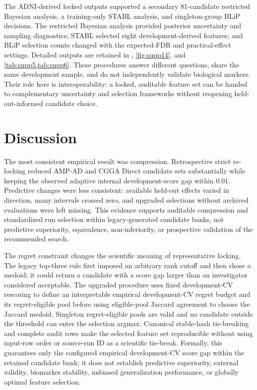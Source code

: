 The ADNI-derived locked outputs supported a secondary 81-candidate restricted Bayesian analysis, a training-only STABL analysis, and singleton-group BLiP decisions. The restricted Bayesian analysis provided posterior uncertainty and sampling diagnostics; STABL selected eight development-derived features; and BLiP selection counts changed with the expected-FDR and practical-effect settings. Detailed outputs are retained in , \cref{fig:supp14}, and \cref{tab:supp5,tab:supp6}. These procedures answer different questions, share the same development sample, and do not independently validate biological markers. Their role here is interoperability: a locked, auditable feature set can be handed to complementary uncertainty and selection frameworks without reopening held-out-informed candidate choice.

\FloatBarrier
\section{Discussion}

The most consistent empirical result was compression. Retrospective strict re-locking reduced AMP-AD and CGGA Direct candidate sets substantially while keeping the observed adaptive internal development-score gap within 0.01. Predictive changes were less consistent: available held-out effects varied in direction, many intervals crossed zero, and upgraded selections without archived evaluations were left missing. This evidence supports auditable compression and standardized run selection within legacy-generated candidate banks, not predictive superiority, equivalence, non-inferiority, or prospective validation of the recommended search.

The regret constraint changes the scientific meaning of representative locking. The legacy top-three rule first imposed an arbitrary rank cutoff and then chose a medoid; it could return a candidate with a score gap larger than an investigator considered acceptable. The upgraded procedure uses fixed development-CV rescoring to define an interpretable empirical development-CV regret budget and its regret-eligible pool before using eligible-pool Jaccard agreement to choose the Jaccard medoid. Singleton regret-eligible pools are valid and no candidate outside the threshold can enter the selection argmax. Canonical stable-hash tie-breaking and complete audit rows make the selected feature set reproducible without using input-row order or source-run ID as a scientific tie-break. Formally, this guarantees only the configured empirical development-CV score gap within the retained candidate bank; it does not establish predictive superiority, external validity, biomarker stability, unbiased generalization performance, or globally optimal feature selection.

